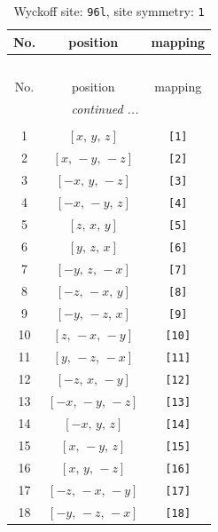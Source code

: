 \documentclass[fleqn,8pt]{jsarticle}
\begin{document}
\renewcommand{\arraystretch}{1.2}
\begin{longtable}{ccc}
\caption{Wyckoff site: {\tt 96l}, site symmetry: {\tt 1}}
 \\
 \hline \hline
No. & position & mapping \\ \hline \endfirsthead

\multicolumn{2}{l}{\tablename\ \thetable{}} \\
 \hline \hline
No. & position & mapping \\ \hline \endhead

 \hline \hline
\multicolumn{2}{r}{\footnotesize\it continued ...} \\ \endfoot

 \hline \hline
\multicolumn{2}{r}{} \\ \endlastfoot

1 & $\left[ x,\, y,\, z \right]$ & {\tt [1]} \\ \hline
2 & $\left[ x,\, - y,\, - z \right]$ & {\tt [2]} \\ \hline
3 & $\left[ - x,\, y,\, - z \right]$ & {\tt [3]} \\ \hline
4 & $\left[ - x,\, - y,\, z \right]$ & {\tt [4]} \\ \hline
5 & $\left[ z,\, x,\, y \right]$ & {\tt [5]} \\ \hline
6 & $\left[ y,\, z,\, x \right]$ & {\tt [6]} \\ \hline
7 & $\left[ - y,\, z,\, - x \right]$ & {\tt [7]} \\ \hline
8 & $\left[ - z,\, - x,\, y \right]$ & {\tt [8]} \\ \hline
9 & $\left[ - y,\, - z,\, x \right]$ & {\tt [9]} \\ \hline
10 & $\left[ z,\, - x,\, - y \right]$ & {\tt [10]} \\ \hline
11 & $\left[ y,\, - z,\, - x \right]$ & {\tt [11]} \\ \hline
12 & $\left[ - z,\, x,\, - y \right]$ & {\tt [12]} \\ \hline
13 & $\left[ - x,\, - y,\, - z \right]$ & {\tt [13]} \\ \hline
14 & $\left[ - x,\, y,\, z \right]$ & {\tt [14]} \\ \hline
15 & $\left[ x,\, - y,\, z \right]$ & {\tt [15]} \\ \hline
16 & $\left[ x,\, y,\, - z \right]$ & {\tt [16]} \\ \hline
17 & $\left[ - z,\, - x,\, - y \right]$ & {\tt [17]} \\ \hline
18 & $\left[ - y,\, - z,\, - x \right]$ & {\tt [18]} \\ \hline

\end{longtable}
\end{document}
